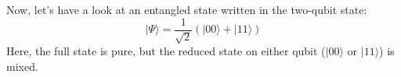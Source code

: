 	\FloatBarrier
	Now, let's have a look at an entangled state written in the two-qubit state:
		\begin{equation}
			|\Psi\rangle = \frac{1}{\sqrt{2}} \left(|00\rangle + |11\rangle \right)
		\end{equation}
	Here, the full state is pure, but the reduced state on either qubit ($|00\rangle$ or $|11\rangle$) is mixed. 
%	 

\FloatBarrier
